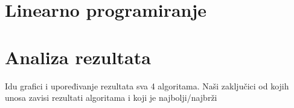 \documentclass[a4paper]{article}
\begin{document}


\section{Linearno programiranje}






\section{Analiza rezultata}
Idu grafici i upoređivanje rezultata sva 4 algoritama.
Naši zaključici od kojih unosa zavisi rezultati algoritama i koji je najbolji/najbrži


\appendix
 


\appendix
\end{document}
